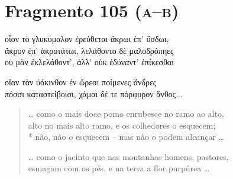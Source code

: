 \pagebreak
\section{Fragmento 105 (\textsc{a--b})}

\begin{gkverse}
οἶον τὸ γλυκύμαλον ἐρεύθεται ἄκρωι ἐπ’ ὔσδωι,\\
ἄκρον ἐπ’ ἀκροτάτωι, λελάθοντο δὲ μαλοδρόπηες\\
οὐ μὰν ἐκλελάθοντ’, ἀλλ’ οὐκ ἐδύναντ’ ἐπίκεσθαι

\hspace*{35mm}

οἴαν τὰν ὐάκινθον ἐν ὤρεσι ποίμενες ἄνδρες\\
πόσσι καταστείβοισι, χάμαι δέ τε πόρφυρον ἄνθος...

\end{gkverse}

\begin{verse}
\ldots{} como o mais doce pomo enrubesce no ramo ao alto,\\
alto no mais alto ramo, e os colhedores o esquecem;\\*
não, não o esquecem -- mas não o podem alcançar \ldots{}

\hspace*{35mm}

\ldots{} como o jacinto que nas montanhas homens, pastores,\\
esmagam com os pés, e na terra a flor purpúrea \ldots{}
\end{verse}

\medskip

